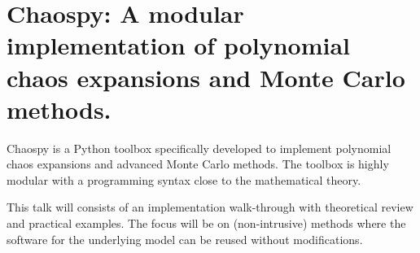 \documentclass[a4paper,10pt]{article}
\begin{document}
\section{Chaospy: A modular implementation of polynomial chaos expansions and Monte Carlo methods.}

Chaospy is a Python toolbox specifically developed to implement polynomial chaos
expansions and advanced Monte Carlo methods. The toolbox is highly modular with a
programming syntax close to the mathematical theory.

This talk will consists of an implementation walk-through with theoretical
review and practical examples. The focus will be on (non-intrusive) methods
where the software for the underlying model can be reused without modifications.
\end{document}
